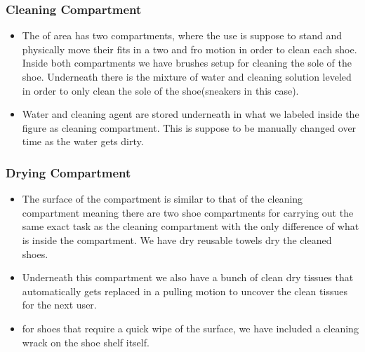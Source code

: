 \subsubsection{Cleaning Compartment}
\begin{itemize}
  \item The of area has two compartments, where the use is suppose to stand and physically move
        their fits in a two and fro motion in order to clean each shoe. Inside both
        compartments  we have brushes setup for cleaning the sole of the shoe. Underneath there is the mixture of water and cleaning solution leveled in order to only clean the sole of the shoe(sneakers in this case).
  \item Water and cleaning agent are stored underneath in what we labeled inside the figure as
        cleaning compartment. This is suppose to be manually changed over time as the water
        gets dirty.
\end{itemize}

\subsubsection{Drying Compartment}
\begin{itemize}
  \item The surface of the compartment is similar to that of the cleaning compartment meaning
        there are two shoe compartments for carrying out the same exact task as the cleaning
        compartment with the only difference of what is inside the compartment. We have dry
        reusable towels dry the cleaned shoes.
  \item Underneath  this compartment we also have a bunch of clean dry tissues that
        automatically gets replaced in a pulling motion to uncover the clean tissues for the
        next user.
  \item for shoes that require a quick wipe of the surface, we have included a cleaning
        wrack on the shoe shelf itself.
\end{itemize}

